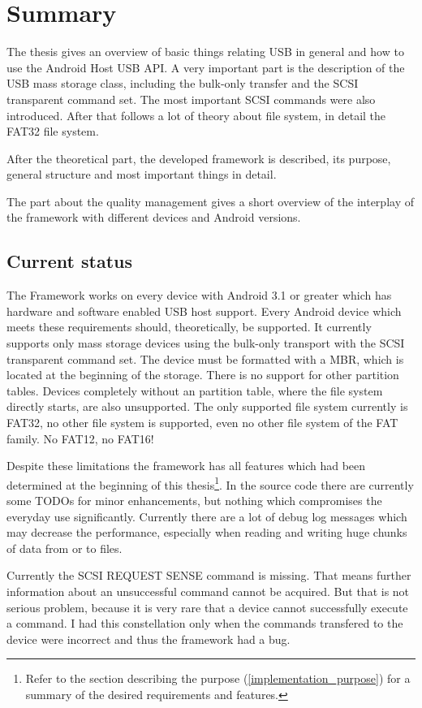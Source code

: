 \chapter{Summary}

The thesis gives an overview of basic things relating USB in general and how to use the Android Host USB API. A very important part is the description of the USB mass storage class, including the bulk-only transfer and the SCSI transparent command set. The most important SCSI commands were also introduced. After that follows a lot of theory about file system, in detail the FAT32 file system.

After the theoretical part, the developed framework is described, its purpose, general structure and most important things in detail.

The part about the quality management gives a short overview of the interplay of the framework with different devices and Android versions.

\section{Current status}

The Framework works on every device with Android 3.1 or greater which has hardware and software enabled USB host support. Every Android device which meets these requirements should, theoretically, be supported. It currently supports only mass storage devices using the bulk-only transport with the SCSI transparent command set. The device must be formatted with a MBR, which is located at the beginning of the storage. There is no support for other partition tables. Devices completely without an partition table, where the file system directly starts, are also unsupported. The only supported file system currently is FAT32, no other file system is supported, even no other file system of the FAT family. No FAT12, no FAT16!

Despite these limitations the framework has all features which had been determined at the beginning of this thesis\footnote{Refer to the section describing the purpose (\ref{implementation_purpose}) for a summary of the desired requirements and features.}. In the source code there are currently some TODOs for minor enhancements, but nothing which compromises the everyday use significantly. Currently there are a lot of debug log messages which may decrease the performance, especially when reading and writing huge chunks of data from or to files.

Currently the SCSI REQUEST SENSE command is missing. That means further information about an unsuccessful command cannot be acquired. But that is not serious problem, because it is very rare that a device cannot successfully execute a command. I had this constellation only when the commands transfered to the device were incorrect and thus the framework had a bug.

